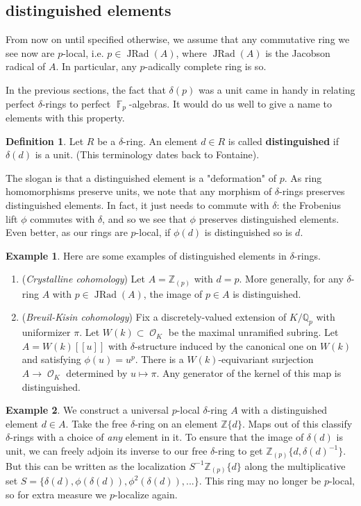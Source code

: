 \documentclass[12pt]{amsproc}
\theoremstyle{definition}
\newtheorem*{definition}{Definition}
\newtheorem*{example}{Example}
\newcommand{\Q}{\mathbb{Q}}
\newcommand{\Z}{\mathbb{Z}}
\newcommand{\ra}{\rightarrow}
\DeclareMathOperator{\JRad}{JRad}
\DeclareMathOperator{\Oh}{\mathscr{O}}
\DeclareMathOperator{\F}{\mathbb{F}}
\begin{document}
\subsection{distinguished elements}

From now on until specified otherwise, we assume that any commutative ring we see now are $p$-local, i.e. $p\in\JRad(A)$, where $\JRad(A)$ is the Jacobson radical of $A$. In particular, any $p$-adically complete ring is so.

In the previous sections, the fact that $\delta(p)$ was a unit came in handy in relating perfect $\delta$-rings to perfect $\F_p$-algebras. It would do us well to give a name to elements with this property.

\begin{definition} Let $R$ be a $\delta$-ring. An element $d\in R$ is called \textbf{distinguished} if $\delta(d)$ is a unit. (This terminology dates back to Fontaine).
\end{definition}

The slogan is that a distinguished element is a "deformation" of $p$. As ring homomorphisms preserve units, we note that any morphism of $\delta$-rings preserves distinguished elements. In fact, it just needs to commute with $\delta$: the Frobenius lift $\phi$ commutes with $\delta$, and so we see that $\phi$ preserves distinguished elements. Even better, as our rings are $p$-local, if $\phi(d)$ is distinguished so is $d$.

\begin{example}
Here are some examples of distinguished elements in $\delta$-rings.
\begin{enumerate} 
\item (\textit{Crystalline cohomology}) Let $A=\Z_{(p)}$ with $d=p$. More generally, for any $\delta$-ring $A$ with $p\in\JRad(A)$, the image of $p\in A$ is distinguished.
\item (\textit{Breuil-Kisin cohomology}) Fix a discretely-valued extension of $K/\Q_p$ with uniformizer $\pi$. Let $W(k)\subset\Oh_K$ be the maximal unramified subring. Let $A=W(k)[\![u]\!]$ with $\delta$-structure induced by the canonical one on $W(k)$ and satisfying $\phi(u)=u^p$. There is a $W(k)$-equivariant surjection $A\ra\Oh_K$ determined by $u\mapsto\pi$. Any generator of the kernel of this map is distinguished.
\end{enumerate}
\end{example}

\begin{example} We construct a universal $p$-local $\delta$-ring $A$ with a distinguished element $d\in A$. Take the free $\delta$-ring on an element $\Z\{d\}$. Maps out of this classify $\delta$-rings with a choice of \textit{any} element in it. To ensure that the image of $\delta(d)$ is  unit, we can freely adjoin its inverse to our free $\delta$-ring to get $\Z_{(p)}\{d,\delta(d)^{-1}\}$. But this can be written as the localization $S^{-1}\Z_{(p)}\{d\}$ along the multiplicative set $S=\{\delta(d),\phi(\delta(d)),\phi^2(\delta(d)),...\}$. This ring may no longer be $p$-local, so for extra measure we $p$-localize again.
\end{example}
\end{document}
